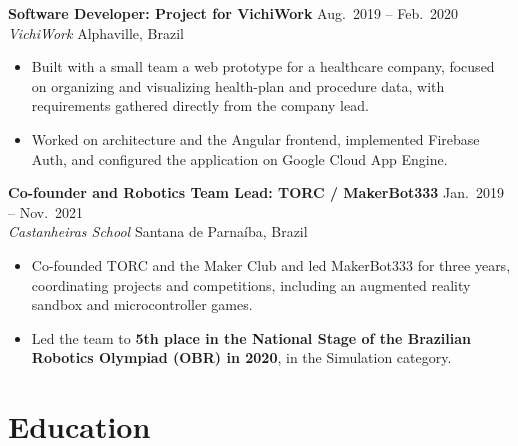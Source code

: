 \documentclass[10pt,a4paper]{article}
\newcommand{\entry}[4]{%
  \textbf{#1} \hfill {\small #3}\\
  {\itshape\color{subgray} #2} \hfill {\small\color{subgray}#4}\par
}
\begin{document}
\vspace{2pt}
\entry{Software Developer: Project for VichiWork}{VichiWork}{Aug.\ 2019 -- Feb.\ 2020}{Alphaville, Brazil}
\begin{itemize}
  \item Built with a small team a web prototype for a healthcare company, focused on organizing and visualizing health-plan and procedure data, with requirements gathered directly from the company lead.
  \item Worked on architecture and the Angular frontend, implemented Firebase Auth, and configured the application on Google Cloud App Engine.
\end{itemize}


\vspace{2pt}
\entry{Co-founder and Robotics Team Lead: TORC / MakerBot333}{Castanheiras School}{Jan.\ 2019 -- Nov.\ 2021}{Santana de Parnaíba, Brazil}
\begin{itemize}
  \item Co-founded TORC and the Maker Club and led MakerBot333 for three years, coordinating projects and competitions, including an augmented reality sandbox and microcontroller games.
  \item Led the team to \textbf{5th place in the National Stage of the Brazilian Robotics Olympiad (OBR) in 2020}, in the Simulation category.
\end{itemize}


\section{Education}
\end{document}

